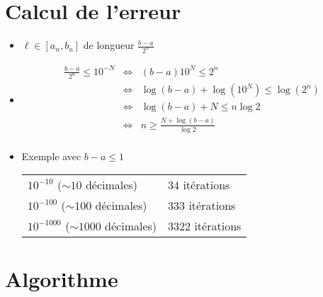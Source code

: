 \section{Calcul de l'erreur}

\begin{frame}

\begin{itemize}\setlength{\itemsep}{6pt}
  \item $\ell \in [a_n,b_n]$ de longueur $\frac{b-a}{2^n}$
  
\pause

  \item $$\begin{array}{rcl}
\frac{b-a}{2^n} \le 10^{-N} 
 & \iff & (b-a)10^N \le 2^n  \\
 & \iff & \log(b-a) + \log(10^N)  \le \log(2^n) \\
 & \iff & \log(b-a) + N \le n \log 2 \\
 & \iff & n \ge \frac{N +  \log(b-a)}{\log 2} \\            
          \end{array}
$$


\pause

  \item Exemple avec $b-a \le 1$

\begin{center}
\begin{tabular}{ll}
  $10^{-10}$ ($\sim 10$ décimales) &  $34$ itérations \\
  $10^{-100}$ ($\sim 100$ décimales) &  $333$ itérations \\ 
  $10^{-1000}$ ($\sim 1000$ décimales) &  $3322$ itérations \\ 
\end{tabular}  
\end{center}
  
\end{itemize}

\end{frame}



\section{Algorithme}

